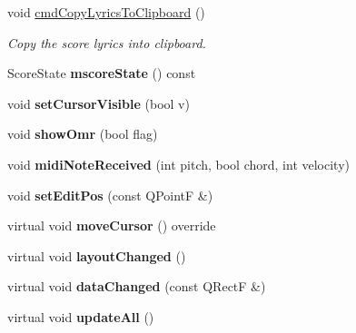 \begin{DoxyCompactItemize}
void \hyperlink{class_ms_1_1_score_view_a89d82d8e3e9eebf0ec8d360053df5633}{cmd\+Copy\+Lyrics\+To\+Clipboard} ()
\begin{DoxyCompactList}\small\item\em Copy the score lyrics into clipboard. \end{DoxyCompactList}\item 
\mbox{\label{class_ms_1_1_score_view_af7b330b203a0ae0903e15f97a9e7643c}} 
Score\+State {\bfseries mscore\+State} () const
\item 
\mbox{\label{class_ms_1_1_score_view_a8ebb01272b4e856e74658397e4ab05d3}} 
void {\bfseries set\+Cursor\+Visible} (bool v)
\item 
\mbox{\label{class_ms_1_1_score_view_a42b6cf66302e9e231aed43340fc8ec74}} 
void {\bfseries show\+Omr} (bool flag)
\item 
\mbox{\label{class_ms_1_1_score_view_a3e4dce39cb7000ffb7b6b9624a08a553}} 
void {\bfseries midi\+Note\+Received} (int pitch, bool chord, int velocity)
\item 
\mbox{\label{class_ms_1_1_score_view_a0c41da8a7d147d32b08d0e72ee081789}} 
void {\bfseries set\+Edit\+Pos} (const Q\+PointF \&)
\item 
\mbox{\label{class_ms_1_1_score_view_aab24975d37461c662a3643a89586075f}} 
virtual void {\bfseries move\+Cursor} () override
\item 
\mbox{\label{class_ms_1_1_score_view_aa67e400c9c8e3d1f8eab3cf97fb7e691}} 
virtual void {\bfseries layout\+Changed} ()
\item 
\mbox{\label{class_ms_1_1_score_view_a140eb5996ea9bba125371c43372a3ac5}} 
virtual void {\bfseries data\+Changed} (const Q\+RectF \&)
\item 
\mbox{\label{class_ms_1_1_score_view_a34b7ca83b68623778f5668c03b64ee35}} 
virtual void {\bfseries update\+All} ()
\item 
\mbox{\label{class_ms_1_1_score_view_a27bdaf78119718fd003b77ab1a5da73d}} 

\end{DoxyCompactItemize}
